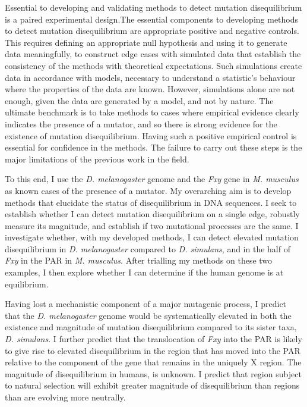 Essential to developing and validating methods to detect mutation disequilibrium is a paired experimental design.The essential components to developing methods to detect mutation disequilibrium are appropriate positive and negative controls. This requires defining an appropriate null hypothesis and using it to generate data meaningfully, to construct edge cases with simulated data that establish the consistency of the methods with theoretical expectations. Such simulations create data in accordance with models, necessary to understand a statistic's behaviour where the properties of the data are known. However, simulations alone are not enough, given the data are generated by a model, and not by nature. The ultimate benchmark is to take methods to cases where empirical evidence clearly indicates the presence of a mutator, and so there is strong evidence for the existence of mutation disequilibrium. Having such a positive empirical control is essential for confidence in the methods. The failure to carry out these steps is the major limitations of the previous work in the field. 

To this end, I use the \textit{D. melanogaster} genome and the \textit{Fxy} gene in \textit{M. musculus} as known cases of the presence of a mutator. My overarching aim is to develop methods that elucidate the status of disequilibrium in DNA sequences. I seek to establish whether I can detect mutation disequilibrium on a single edge, robustly measure its magnitude, and establish if two mutational processes are the same. I investigate whether, with my developed methods, I can detect elevated mutation disequilibrium in \textit{D. melanogaster} compared to \textit{D. simulans}, and in the half of \textit{Fxy} in the PAR in \textit{M. musculus}. After trialling my methods on these two examples, I then explore whether I can determine if the human genome is at equilibrium.

Having lost a mechanistic component of a major mutagenic process, I predict that the \textit{D. melanogaster} genome would be systematically elevated in both the existence and magnitude of mutation disequilibrium compared to its sister taxa, \textit{D. simulans}. I further predict that the translocation of \textit{Fxy} into the PAR is likely to give rise to elevated disequilibrium in the region that has moved into the PAR relative to the component of the gene that remains in the uniquely X region. The magnitude of disequilibrium in humans, is unknown. I predict that region subject to natural selection will exhibit greater magnitude of disequilibrium than regions than are evolving more neutrally. 

